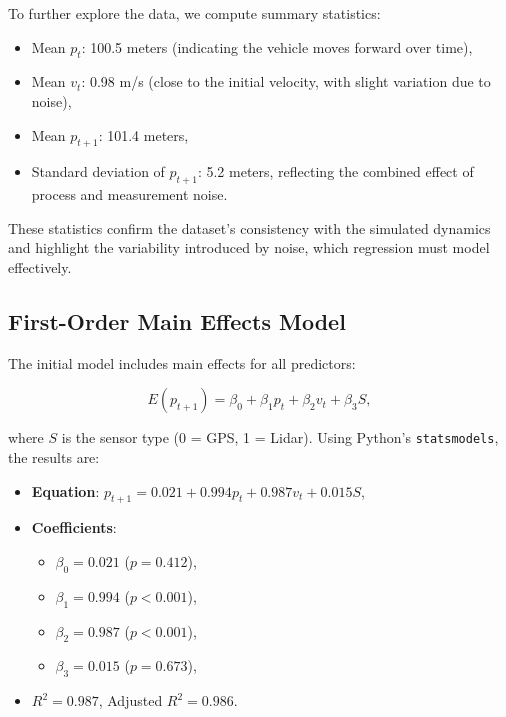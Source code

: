 \documentclass[12pt]{article}
\begin{document}
To further explore the data, we compute summary statistics:
\begin{itemize}
    \item Mean \( p_t \): 100.5 meters (indicating the vehicle moves forward over time),
    \item Mean \( v_t \): 0.98 m/s (close to the initial velocity, with slight variation due to noise),
    \item Mean \( p_{t+1} \): 101.4 meters,
    \item Standard deviation of \( p_{t+1} \): 5.2 meters, reflecting the combined effect of process and measurement noise.
\end{itemize}

These statistics confirm the dataset’s consistency with the simulated dynamics and highlight the variability introduced by noise, which regression must model effectively.

\subsection{First-Order Main Effects Model}
\label{subsec:main_effects}

The initial model includes main effects for all predictors:

\begin{equation}
    E(p_{t+1}) = \beta_0 + \beta_1 p_t + \beta_2 v_t + \beta_3 S,
    \label{eq:main_effects}
\end{equation}

where \( S \) is the sensor type (0 = GPS, 1 = Lidar). Using Python’s \texttt{statsmodels}, the results are:

\begin{itemize}
    \item \textbf{Equation}: \( p_{t+1} = 0.021 + 0.994 p_t + 0.987 v_t + 0.015 S \),
    \item \textbf{Coefficients}:
    \begin{itemize}
        \item \( \beta_0 = 0.021 \) (\( p = 0.412 \)),
        \item \( \beta_1 = 0.994 \) (\( p < 0.001 \)),
        \item \( \beta_2 = 0.987 \) (\( p < 0.001 \)),
        \item \( \beta_3 = 0.015 \) (\( p = 0.673 \)),
    \end{itemize}
    \item \( R^2 = 0.987 \), Adjusted \( R^2 = 0.986 \).
\end{itemize}
\end{document}
